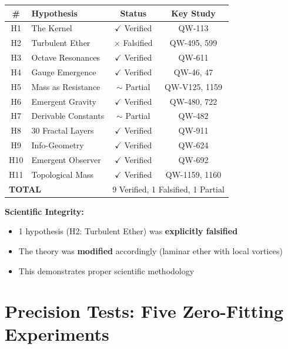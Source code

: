 \documentclass[11pt, a4paper]{article}
\theoremstyle{remark}
\begin{document}
\begin{center}
\begin{tabular}{|c|l|c|c|}
\hline
\textbf{\#} & \textbf{Hypothesis} & \textbf{Status} & \textbf{Key Study} \\
\hline
H1 & The Kernel & $\checkmark$ Verified & QW-113 \\
H2 & Turbulent Ether & $\times$ Falsified & QW-495, 599 \\
H3 & Octave Resonances & $\checkmark$ Verified & QW-611 \\
H4 & Gauge Emergence & $\checkmark$ Verified & QW-46, 47 \\
H5 & Mass as Resistance & $\sim$ Partial & QW-V125, 1159 \\
H6 & Emergent Gravity & $\checkmark$ Verified & QW-480, 722 \\
H7 & Derivable Constants & $\sim$ Partial & QW-482 \\
H8 & 30 Fractal Layers & $\checkmark$ Verified & QW-911 \\
H9 & Info-Geometry & $\checkmark$ Verified & QW-624 \\
H10 & Emergent Observer & $\checkmark$ Verified & QW-692 \\
H11 & Topological Mass & $\checkmark$ Verified & QW-1159, 1160 \\
\hline
\multicolumn{2}{|l|}{\textbf{TOTAL}} & \multicolumn{2}{c|}{9 Verified, 1 Falsified, 1 Partial} \\
\hline
\end{tabular}
\end{center}

\textbf{Scientific Integrity:}
\begin{itemize}
    \item 1 hypothesis (H2: Turbulent Ether) was \textbf{explicitly falsified}
    \item The theory was \textbf{modified} accordingly (laminar ether with local vortices)
    \item This demonstrates proper scientific methodology
\end{itemize}

\part{Precision Tests: Five Zero-Fitting Experiments}
\end{document}
